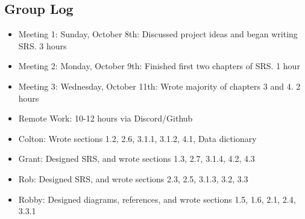 \documentclass[11pt]{report}
\begin{document}
\begin{appendices}

    \chapter{Group Log}
    \begin{itemize}
        \item Meeting 1: Sunday, October 8th: Discussed project ideas and began writing SRS. 3 hours
        \item Meeting 2: Monday, October 9th: Finished first two chapters of SRS. 1 hour
        \item Meeting 3: Wednesday, October 11th: Wrote majority of chapters 3 and 4. 2 hours
        \item Remote Work: 10-12 hours via Discord/Github
        \item Colton: Wrote sections 1.2, 2.6, 3.1.1, 3.1.2, 4.1, Data dictionary
        \item Grant: Designed SRS, and wrote sections 1.3, 2.7, 3.1.4, 4.2, 4.3
        \item Rob: Designed SRS, and wrote sections 2.3, 2.5, 3.1.3, 3.2, 3.3
        \item Robby: Designed diagrams, references, and wrote sections 1.5, 1.6, 2.1, 2.4, 3.3.1
    \end{itemize}


\end{appendices}
\end{document}
